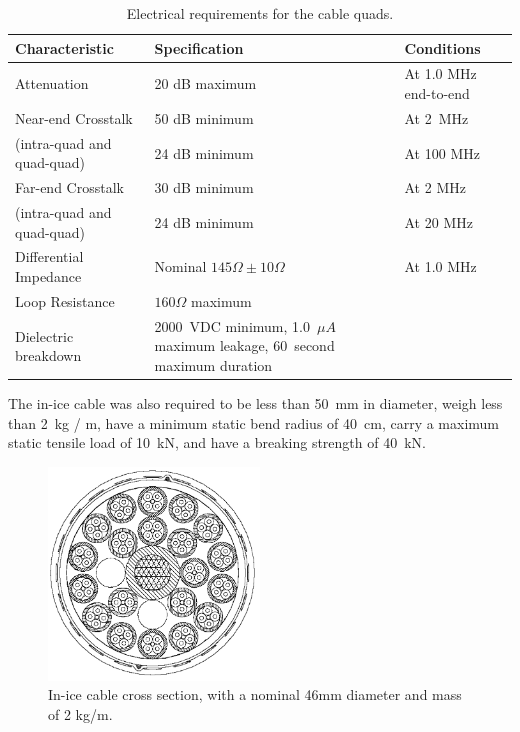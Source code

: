 \begin{table}[h]
  \centering
  \begin{tabularx}{\textwidth}{| l | X | X | }
    \hline
    \bf{Characteristic} & \bf{Specification} & \bf{Conditions} \\
    \hline

    Attenuation & 20 dB maximum & At 1.0 MHz end-to-end \\
    \hline
%

   Near-end Crosstalk& 50 dB minimum & At 2~MHz \\
(intra-quad and quad-quad)&24 dB minimum& At 100 MHz\\
\hline
   Far-end Crosstalk & 30 dB minimum & At 2 MHz \\
(intra-quad and quad-quad)&24 dB minimum& At 20 MHz\\

    \hline

    Differential Impedance & Nominal $145\Omega \pm 10\Omega$ & At 1.0 MHz \\
    \hline

    Loop Resistance & $160\Omega$ maximum & \\
    \hline

    Dielectric breakdown & 2000~VDC minimum, 1.0~$\mu A$ maximum leakage, 60~second
    maximum duration & \\
    \hline    
  \end{tabularx}
  \caption{Electrical requirements for the cable quads.} 
  \label{tab:quad_requirements}
\end{table}

 The in-ice cable was also required to be less than 50~mm in
 diameter, weigh less than 2~kg / m, have a minimum static bend radius of 40~cm,
 carry a maximum static tensile load of 10~kN, and have a breaking strength
 of 40~kN.
 
\begin{figure}
  \centering
  \includegraphics[width=0.5\textwidth]{graphics/cables/cable_xsection.png}
  \caption{\label{fig:cable_xsection}In-ice cable cross
    section, with a nominal 46mm diameter and mass of 2 kg/m.} 
\end{figure}

